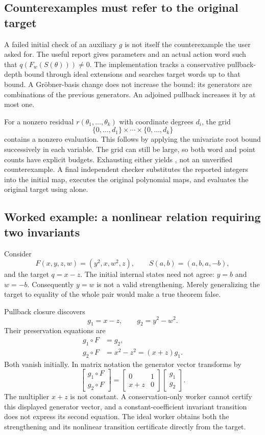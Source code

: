 \subsection{Counterexamples must refer to the original target}

A failed initial check of an auxiliary $g$ is not itself the counterexample the
user asked for. The useful report gives parameters and an actual action word
such that $q(F_w(S(\theta)))\ne0$. The implementation tracks a conservative
pullback-depth bound through ideal extensions and searches target words up to
that bound. A Gr\"obner-basis change does not increase the bound: its generators
are combinations of the previous generators. An adjoined pullback increases it
by at most one.

For a nonzero residual $r(\theta_1,\ldots,\theta_k)$ with coordinate degrees
$d_i$, the grid
\[
 \{0,\ldots,d_1\}\times\cdots\times\{0,\ldots,d_k\}
\]
contains a nonzero evaluation. This follows by applying the univariate root
bound successively in each variable. The grid can still be large, so both word
and point counts have explicit budgets. Exhausting either yields \Unknown, not
an unverified counterexample. A final independent checker substitutes the
reported integers into the initial map, executes the original polynomial maps,
and evaluates the original target using  alone.

\subsection{Worked example: a nonlinear relation requiring two invariants}
\label{sec:mutual}

Consider
\[
 F(x,y,z,w)=(y^2,x,w^2,z),\qquad S(a,b)=(a,b,a,-b),
\]
and the target $q=x-z$. The initial internal states need not agree: $y=b$ and
$w=-b$. Consequently $y=w$ is not a valid strengthening. Merely generalizing
the target to equality of the whole pair would make a true theorem false.

Pullback closure discovers
\[
 g_1=x-z,\qquad g_2=y^2-w^2.
\]
Their preservation equations are
\begin{align*}
 g_1\circ F&=g_2,\\
 g_2\circ F&=x^2-z^2=(x+z)g_1.
\end{align*}
Both vanish initially. In matrix notation the generator vector transforms by
\[
 \begin{bmatrix}g_1\circ F\\g_2\circ F\end{bmatrix}
 =\begin{bmatrix}0&1\\x+z&0\end{bmatrix}
 \begin{bmatrix}g_1\\g_2\end{bmatrix}.
\]
The multiplier $x+z$ is not constant. A conservation-only worker cannot certify
this displayed generator vector, and a constant-coefficient invariant
transition does not express its second equation. The ideal worker obtains both
the strengthening and its nonlinear transition certificate directly from the
target.


